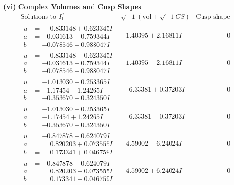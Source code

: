 \documentclass[1p]{elsarticle_modified}
\theoremstyle{definition}
\newcommand{\I}{\sqrt{-1}}
\begin{document}
\newpage\flushleft \textbf{(vi) Complex Volumes and Cusp Shapes}
$$\begin{array}{c|c|c}  
\text{Solutions to }I^u_{1}& \I (\text{vol} + \sqrt{-1}CS) & \text{Cusp shape}\\
 \hline 
\begin{aligned}
u &= \phantom{-}0.833148 + 0.623345 I \\
a &= -0.031613 + 0.759344 I \\
b &= -0.078546 - 0.988047 I\end{aligned}
 & -1.40395 + 2.16811 I & \phantom{-0.000000 } 0 \\ \hline\begin{aligned}
u &= \phantom{-}0.833148 - 0.623345 I \\
a &= -0.031613 - 0.759344 I \\
b &= -0.078546 + 0.988047 I\end{aligned}
 & -1.40395 - 2.16811 I & \phantom{-0.000000 } 0 \\ \hline\begin{aligned}
u &= -1.013030 + 0.253365 I \\
a &= -1.17454 - 1.24265 I \\
b &= -0.353670 + 0.324350 I\end{aligned}
 & \phantom{-}6.33381 + 0.37203 I & \phantom{-0.000000 } 0 \\ \hline\begin{aligned}
u &= -1.013030 - 0.253365 I \\
a &= -1.17454 + 1.24265 I \\
b &= -0.353670 - 0.324350 I\end{aligned}
 & \phantom{-}6.33381 - 0.37203 I & \phantom{-0.000000 } 0 \\ \hline\begin{aligned}
u &= -0.847878 + 0.624079 I \\
a &= \phantom{-}0.820203 + 0.073555 I \\
b &= \phantom{-}0.173341 + 0.046759 I\end{aligned}
 & -4.59002 - 6.24024 I & \phantom{-0.000000 } 0 \\ \hline\begin{aligned}
u &= -0.847878 - 0.624079 I \\
a &= \phantom{-}0.820203 - 0.073555 I \\
b &= \phantom{-}0.173341 - 0.046759 I\end{aligned}
 & -4.59002 + 6.24024 I & \phantom{-0.000000 } 0 \\ \hline\begin{aligned}

\end{aligned}
\end{array}$$
\end{document}
